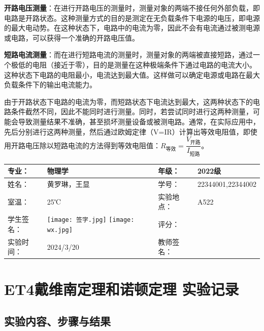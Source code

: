 \documentclass[dvipsnames, svgnames,a4paper,11pt]{article}
\begin{document}
\textbf{开路电压测量}：在进行开路电压的测量时，测量对象的两端不接任何外部负载，即电路是开路状态。这种测量方式的目的是测定在无负载条件下电源的电压，即电源的最大电动势。在这种状态下，电路中的电流为零，因此不会有电流通过被测电源或电路，可以获得一个准确的开路电压值。

\textbf{短路电流测量}：而在进行短路电流的测量时，测量对象的两端被直接短路，通过一个极低的电阻（接近于零），目的是测量在这种极端条件下通过电路的电流大小。这种状态下电路的电阻最小，电流达到最大值。这样做可以确定电源或电路在最大负载条件下的输出电流能力。

由于开路状态下电路的电流为零，而短路状态下电流达到最大，这两种状态下的电路条件截然不同，因此不能同时进行测量。同时，若尝试同时进行这两种测量，可能会导致测量结果不准确，甚至损坏测量设备或被测电路。通常，在实际应用中，先后分别进行这两种测量，然后通过欧姆定律（V=IR）计算出等效电阻值，即使用开路电压除以短路电流的方法得到等效电阻值：$ R_{\text{等效}} = \dfrac{V_{\text{开路}}}{I_{\text{短路}}} $。
	
	
	\clearpage
	
	\begin{table}
		\renewcommand\arraystretch{1.7}
		\centering
		\begin{tabularx}{\textwidth}{|X|X|X|X|}
			\hline
			专业： & 物理学 & 年级： & 2022级 \\
			\hline
			姓名： & 黄罗琳，王显& 学号： &22344001,22344002 \\
			\hline
			室温： &  25℃& 实验地点： & A522 \\
			\hline
			学生签名：& \texttt{[image: 签字.jpg]} \texttt{[image: wx.jpg]}  & 评分： &\\
			\hline
			实验时间：& 2024/3/20 & 教师签名：&\\
			\hline
		\end{tabularx}
	\end{table}
	
	\section{ET4戴维南定理和诺顿定理  \quad\heiti 实验记录}
	
	\subsection{实验内容、步骤与结果}
	
\end{document}
